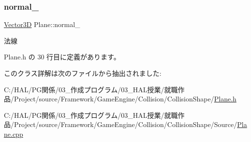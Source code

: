 \subsubsection{\texorpdfstring{normal\+\_\+}{normal\_}}
{\footnotesize\ttfamily \mbox{\hyperlink{class_vector3_d}{Vector3D}} Plane\+::normal\+\_\+\hspace{0.3cm}{\ttfamily [private]}}



法線 



 Plane.\+h の 30 行目に定義があります。



このクラス詳解は次のファイルから抽出されました\+:\begin{DoxyCompactItemize}
\item 
C\+:/\+H\+A\+L/\+P\+G関係/03\+\_\+作成プログラム/03\+\_\+\+H\+A\+L授業/就職作品/\+Project/source/\+Framework/\+Game\+Engine/\+Collision/\+Collision\+Shape/\mbox{\hyperlink{_plane_8h}{Plane.\+h}}\item 
C\+:/\+H\+A\+L/\+P\+G関係/03\+\_\+作成プログラム/03\+\_\+\+H\+A\+L授業/就職作品/\+Project/source/\+Framework/\+Game\+Engine/\+Collision/\+Collision\+Shape/\+Source/\mbox{\hyperlink{_plane_8cpp}{Plane.\+cpp}}\end{DoxyCompactItemize}
